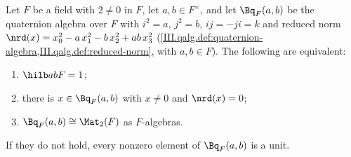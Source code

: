 Let $F$ be a field with $2\ne0$ in $F$, let $a,b\in F^\times$, and let $\Bq_F(a,b)$ be the quaternion algebra over $F$ with $i^2=a$,
$j^2=b$, $ij=-ji=k$ and reduced norm $\nrd(x)=x_0^2-a\,x_1^2-b\,x_2^2+ab\,x_3^2$ (\cref{III.qalg.def:quaternion-algebra,III.qalg.def:reduced-norm},
with $a,b\in F$). The following are equivalent:
\begin{enumerate}[label=(\roman*)]
\item $\hilb abF=1$;
\item there is $x\in\Bq_F(a,b)$ with $x\ne0$ and $\nrd(x)=0$;
\item $\Bq_F(a,b)\cong\Mat_2(F)$ as $F$-algebras.
\end{enumerate}
If they do not hold, every nonzero element of $\Bq_F(a,b)$ is a unit.
